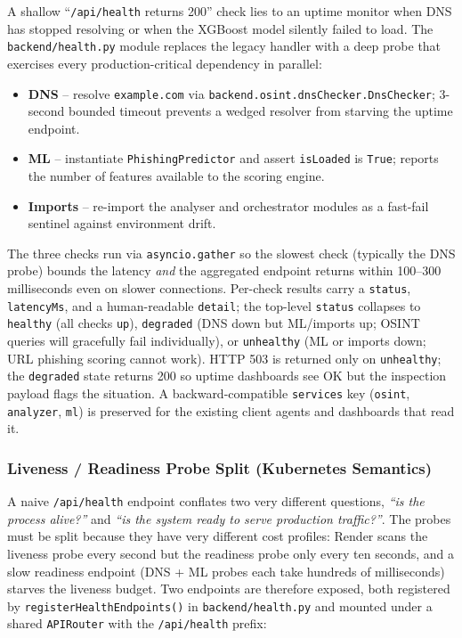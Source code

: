 A shallow ``\texttt{/api/health} returns 200'' check lies to an uptime monitor when DNS has stopped resolving or when the XGBoost model silently failed to load. The \texttt{backend/health.py} module replaces the legacy handler with a deep probe that exercises every production-critical dependency in parallel:

\begin{itemize}
\item
  \textbf{DNS} -- resolve \texttt{example.com} via \texttt{backend.osint.dnsChecker.DnsChecker}; 3-second bounded timeout prevents a wedged resolver from starving the uptime endpoint.
\item
  \textbf{ML} -- instantiate \texttt{PhishingPredictor} and assert \texttt{isLoaded} is \texttt{True}; reports the number of features available to the scoring engine.
\item
  \textbf{Imports} -- re-import the analyser and orchestrator modules as a fast-fail sentinel against environment drift.
\end{itemize}

The three checks run via \texttt{asyncio.gather} so the slowest check (typically the DNS probe) bounds the latency \emph{and} the aggregated endpoint returns within 100--300 milliseconds even on slower connections. Per-check results carry a \texttt{status}, \texttt{latencyMs}, and a human-readable \texttt{detail}; the top-level \texttt{status} collapses to \texttt{healthy} (all checks \texttt{up}), \texttt{degraded} (DNS down but ML/imports up; OSINT queries will gracefully fail individually), or \texttt{unhealthy} (ML or imports down; URL phishing scoring cannot work). HTTP 503 is returned only on \texttt{unhealthy}; the \texttt{degraded} state returns 200 so uptime dashboards see OK but the inspection payload flags the situation. A backward-compatible \texttt{services} key (\texttt{osint}, \texttt{analyzer}, \texttt{ml}) is preserved for the existing client agents and dashboards that read it.

\subsubsection{Liveness / Readiness Probe Split (Kubernetes Semantics)} A naive \texttt{/api/health} endpoint conflates two very different questions, \emph{``is the process alive?''} and \emph{``is the system ready to serve production traffic?''}. The probes must be split because they have very different cost profiles: Render scans the liveness probe every second but the readiness probe only every ten seconds, and a slow readiness endpoint (DNS + ML probes each take hundreds of milliseconds) starves the liveness budget. Two endpoints are therefore exposed, both registered by \texttt{registerHealthEndpoints()} in \texttt{backend/health.py} and mounted under a shared \texttt{APIRouter} with the \texttt{/api/health} prefix:

